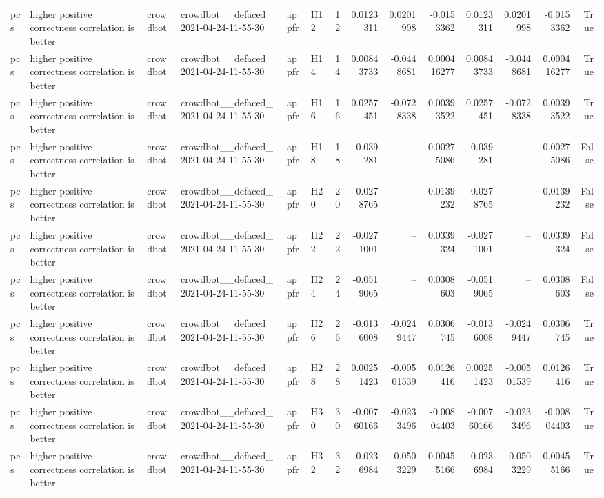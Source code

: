 \begin{longtable}{llllllrrrrrrrr}
pcs & higher positive correctness correlation is better & crowdbot & crowdbot\_\_defaced\_2021-04-24-11-55-30 & appfr & H12 & 12 & 0.0123311 & 0.0201998 & -0.0153362 & 0.0123311 & 0.0201998 & -0.0153362 & True \\
pcs & higher positive correctness correlation is better & crowdbot & crowdbot\_\_defaced\_2021-04-24-11-55-30 & appfr & H14 & 14 & 0.00843733 & -0.0448681 & 0.000416277 & 0.00843733 & -0.0448681 & 0.000416277 & True \\
pcs & higher positive correctness correlation is better & crowdbot & crowdbot\_\_defaced\_2021-04-24-11-55-30 & appfr & H16 & 16 & 0.0257451 & -0.0728338 & 0.00393522 & 0.0257451 & -0.0728338 & 0.00393522 & True \\
pcs & higher positive correctness correlation is better & crowdbot & crowdbot\_\_defaced\_2021-04-24-11-55-30 & appfr & H18 & 18 & -0.039281 & -- & 0.00275086 & -0.039281 & -- & 0.00275086 & False \\
pcs & higher positive correctness correlation is better & crowdbot & crowdbot\_\_defaced\_2021-04-24-11-55-30 & appfr & H20 & 20 & -0.0278765 & -- & 0.0139232 & -0.0278765 & -- & 0.0139232 & False \\
pcs & higher positive correctness correlation is better & crowdbot & crowdbot\_\_defaced\_2021-04-24-11-55-30 & appfr & H22 & 22 & -0.0271001 & -- & 0.0339324 & -0.0271001 & -- & 0.0339324 & False \\
pcs & higher positive correctness correlation is better & crowdbot & crowdbot\_\_defaced\_2021-04-24-11-55-30 & appfr & H24 & 24 & -0.0519065 & -- & 0.0308603 & -0.0519065 & -- & 0.0308603 & False \\
pcs & higher positive correctness correlation is better & crowdbot & crowdbot\_\_defaced\_2021-04-24-11-55-30 & appfr & H26 & 26 & -0.0136008 & -0.0249447 & 0.0306745 & -0.0136008 & -0.0249447 & 0.0306745 & True \\
pcs & higher positive correctness correlation is better & crowdbot & crowdbot\_\_defaced\_2021-04-24-11-55-30 & appfr & H28 & 28 & 0.00251423 & -0.00501539 & 0.0126416 & 0.00251423 & -0.00501539 & 0.0126416 & True \\
pcs & higher positive correctness correlation is better & crowdbot & crowdbot\_\_defaced\_2021-04-24-11-55-30 & appfr & H30 & 30 & -0.00760166 & -0.0233496 & -0.00804403 & -0.00760166 & -0.0233496 & -0.00804403 & True \\
pcs & higher positive correctness correlation is better & crowdbot & crowdbot\_\_defaced\_2021-04-24-11-55-30 & appfr & H32 & 32 & -0.0236984 & -0.0503229 & 0.00455166 & -0.0236984 & -0.0503229 & 0.00455166 & True \\

\end{longtable}
